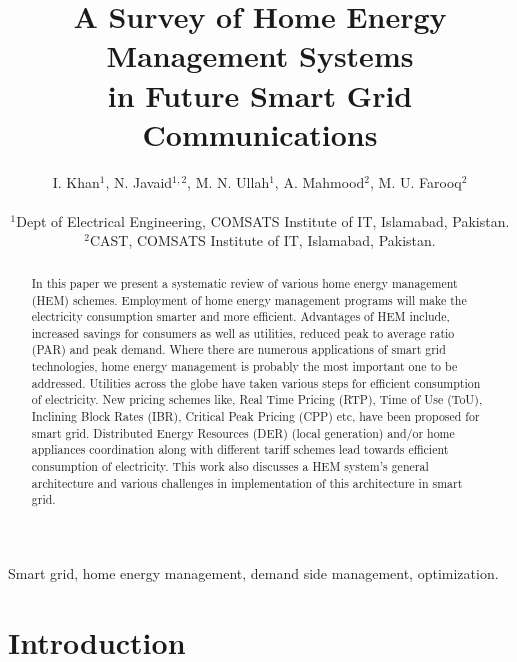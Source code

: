 \documentclass[journal]{IEEEtran}
\begin{document}
\title{A Survey of Home Energy Management Systems\\ in Future Smart Grid Communications}

\author{I. Khan$^{1}$, N. Javaid$^{1,2}$, M. N. Ullah$^{1}$, A. Mahmood$^{2}$, M. U. Farooq$^{2}$\\\vspace{0.4cm}

$^{1}$Dept of Electrical Engineering, COMSATS Institute of IT, Islamabad, Pakistan.\\
$^{2}$CAST, COMSATS Institute of IT, Islamabad, Pakistan.}

\maketitle

\begin{abstract}
\boldmath
In this paper we present a systematic review of various home energy management (HEM) schemes. Employment of home energy management programs will make the electricity consumption smarter and more efficient. Advantages of HEM  include, increased savings for consumers as well as utilities, reduced peak to average ratio (PAR) and peak demand. Where there are numerous applications of smart grid technologies, home energy management is probably the most important one to be addressed. Utilities across the globe have taken various steps for efficient consumption of electricity. New pricing schemes like, Real Time Pricing (RTP), Time of Use (ToU), Inclining Block Rates (IBR), Critical Peak Pricing (CPP) etc, have been proposed for smart grid. Distributed Energy Resources (DER) (local generation) and/or home appliances coordination along with different tariff schemes lead towards efficient consumption of electricity. This work also discusses a HEM system's general architecture and various challenges in implementation of this architecture in smart grid.

\end{abstract}

\begin{IEEEkeywords}
Smart grid, home energy management, demand side management, optimization.
\end{IEEEkeywords}

\IEEEpeerreviewmaketitle
\section{Introduction}
\end{document}
